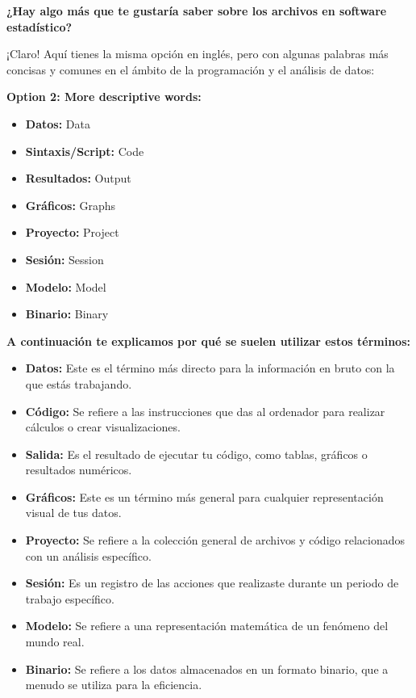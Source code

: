 \documentclass[
  jou,
  floatsintext,
  longtable,
  a4paper,
  nolmodern,
  notxfonts,
  notimes,
  colorlinks=true,linkcolor=blue,citecolor=blue,urlcolor=blue]{apa7}
\providecommand{\tightlist}{%
  \setlength{\itemsep}{0pt}\setlength{\parskip}{0pt}}
\begin{document}
\textbf{¿Hay algo más que te gustaría saber sobre los archivos en
software estadístico?}

¡Claro! Aquí tienes la misma opción en inglés, pero con algunas palabras
más concisas y comunes en el ámbito de la programación y el análisis de
datos:

\textbf{Option 2: More descriptive words:}

\begin{itemize}
\tightlist
\item
  \textbf{Datos:} Data
\item
  \textbf{Sintaxis/Script:} Code
\item
  \textbf{Resultados:} Output
\item
  \textbf{Gráficos:} Graphs
\item
  \textbf{Proyecto:} Project
\item
  \textbf{Sesión:} Session
\item
  \textbf{Modelo:} Model
\item
  \textbf{Binario:} Binary
\end{itemize}

\textbf{A continuación te explicamos por qué se suelen utilizar estos
términos:}

\begin{itemize}
\tightlist
\item
  \textbf{Datos:} Este es el término más directo para la información en
  bruto con la que estás trabajando.
\item
  \textbf{Código:} Se refiere a las instrucciones que das al ordenador
  para realizar cálculos o crear visualizaciones.
\item
  \textbf{Salida:} Es el resultado de ejecutar tu código, como tablas,
  gráficos o resultados numéricos.
\item
  \textbf{Gráficos:} Este es un término más general para cualquier
  representación visual de tus datos.
\item
  \textbf{Proyecto:} Se refiere a la colección general de archivos y
  código relacionados con un análisis específico.
\item
  \textbf{Sesión:} Es un registro de las acciones que realizaste durante
  un periodo de trabajo específico.
\item
  \textbf{Modelo:} Se refiere a una representación matemática de un
  fenómeno del mundo real.
\item
  \textbf{Binario:} Se refiere a los datos almacenados en un formato
  binario, que a menudo se utiliza para la eficiencia.
\end{itemize}
\end{document}
